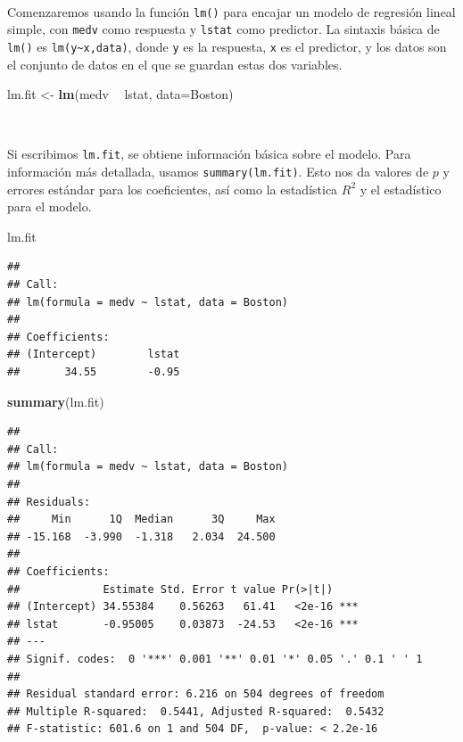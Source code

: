 \documentclass[]{book}
\newenvironment{Shaded}{\begin{snugshade}}{\end{snugshade}}
\newcommand{\KeywordTok}[1]{\textcolor[rgb]{0.13,0.29,0.53}{\textbf{#1}}}
\newcommand{\DataTypeTok}[1]{\textcolor[rgb]{0.13,0.29,0.53}{#1}}
\newcommand{\StringTok}[1]{\textcolor[rgb]{0.31,0.60,0.02}{#1}}
\newcommand{\OperatorTok}[1]{\textcolor[rgb]{0.81,0.36,0.00}{\textbf{#1}}}
\newcommand{\NormalTok}[1]{#1}
\begin{document}
~

Comenzaremos usando la función \texttt{lm()} para encajar un modelo de
regresión lineal simple, con \texttt{medv} como respuesta y
\texttt{lstat} como predictor. La sintaxis básica de \texttt{lm()} es
\texttt{lm(y\textasciitilde{}x,data)}, donde \texttt{y} es la respuesta,
\texttt{x} es el predictor, y los datos son el conjunto de datos en el
que se guardan estas dos variables.

\begin{Shaded}
\begin{Highlighting}[]
\NormalTok{lm.fit <-}\StringTok{ }\KeywordTok{lm}\NormalTok{(medv }\OperatorTok{~}\StringTok{ }\NormalTok{lstat, }\DataTypeTok{data=}\NormalTok{Boston)}
\end{Highlighting}
\end{Shaded}

~

Si escribimos \texttt{lm.fit}, se obtiene información básica sobre el
modelo. Para información más detallada, usamos \texttt{summary(lm.fit)}.
Esto nos da valores de \(p\) y errores estándar para los coeficientes,
así como la estadística \(R^2\) y el estadístico para el modelo.

\begin{Shaded}
\begin{Highlighting}[]
\NormalTok{lm.fit}
\end{Highlighting}
\end{Shaded}

\begin{verbatim}
## 
## Call:
## lm(formula = medv ~ lstat, data = Boston)
## 
## Coefficients:
## (Intercept)        lstat  
##       34.55        -0.95
\end{verbatim}

\begin{Shaded}
\begin{Highlighting}[]
\KeywordTok{summary}\NormalTok{(lm.fit)}
\end{Highlighting}
\end{Shaded}

\begin{verbatim}
## 
## Call:
## lm(formula = medv ~ lstat, data = Boston)
## 
## Residuals:
##     Min      1Q  Median      3Q     Max 
## -15.168  -3.990  -1.318   2.034  24.500 
## 
## Coefficients:
##             Estimate Std. Error t value Pr(>|t|)    
## (Intercept) 34.55384    0.56263   61.41   <2e-16 ***
## lstat       -0.95005    0.03873  -24.53   <2e-16 ***
## ---
## Signif. codes:  0 '***' 0.001 '**' 0.01 '*' 0.05 '.' 0.1 ' ' 1
## 
## Residual standard error: 6.216 on 504 degrees of freedom
## Multiple R-squared:  0.5441, Adjusted R-squared:  0.5432 
## F-statistic: 601.6 on 1 and 504 DF,  p-value: < 2.2e-16
\end{verbatim}
\end{document}
